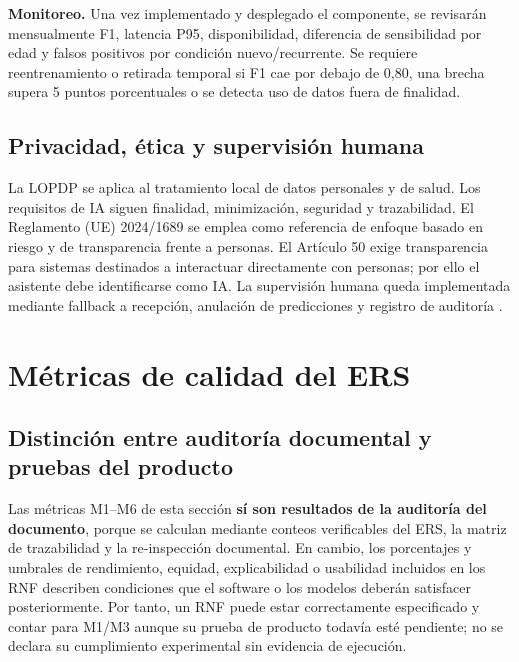 \documentclass[11pt,a4paper]{article}
\begin{document}
	\textbf{Monitoreo.} Una vez implementado y desplegado el componente, se revisarán mensualmente F1, latencia P95, disponibilidad, diferencia de sensibilidad por edad y falsos positivos por condición nuevo/recurrente. Se requiere reentrenamiento o retirada temporal si F1 cae por debajo de 0,80, una brecha supera 5 puntos porcentuales o se detecta uso de datos fuera de finalidad.
	
	\subsection{Privacidad, ética y supervisión humana}
	La LOPDP se aplica al tratamiento local de datos personales y de salud. Los requisitos de IA siguen finalidad, minimización, seguridad y trazabilidad. El Reglamento (UE) 2024/1689 se emplea como referencia de enfoque basado en riesgo y de transparencia frente a personas. El Artículo 50 exige transparencia para sistemas destinados a interactuar directamente con personas; por ello el asistente debe identificarse como IA. La supervisión humana queda implementada mediante fallback a recepción, anulación de predicciones y registro de auditoría \cite{loppd,euaiact2024,whoai2021}.
	\clearpage
	\section{Métricas de calidad del ERS}
	\subsection{Distinción entre auditoría documental y pruebas del producto}
	Las métricas M1--M6 de esta sección \textbf{sí son resultados de la auditoría del documento}, porque se calculan mediante conteos verificables del ERS, la matriz de trazabilidad y la re-inspección documental. En cambio, los porcentajes y umbrales de rendimiento, equidad, explicabilidad o usabilidad incluidos en los RNF describen condiciones que el software o los modelos deberán satisfacer posteriormente. Por tanto, un RNF puede estar correctamente especificado y contar para M1/M3 aunque su prueba de producto todavía esté pendiente; no se declara su cumplimiento experimental sin evidencia de ejecución.
	
\end{document}
